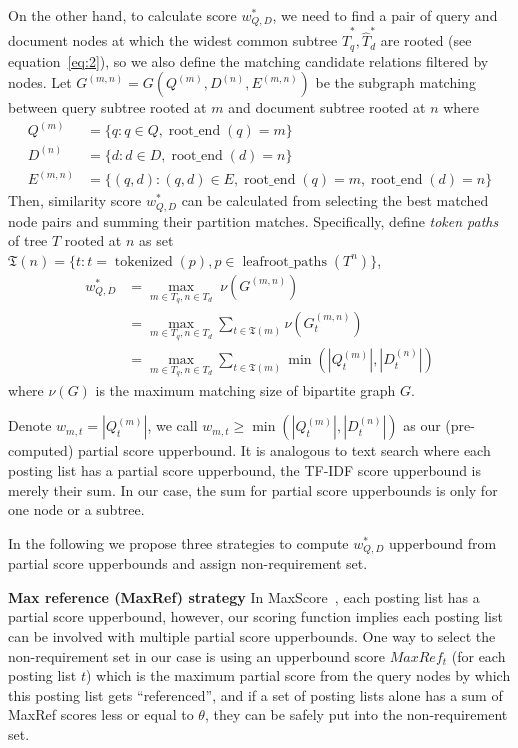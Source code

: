 \documentclass[runningheads]{llncs}
\begin{document}
On the other hand, to calculate score $w^*_{Q, D}$, we need to find a pair of query and document nodes at which the widest common subtree $\hat{T}^*_q, \hat{T}^*_d$ are rooted (see equation~\ref{eq:2}), so we also define the matching candidate relations filtered by nodes.
Let $G^{(m, n)} = G(Q^{(m)}, D^{(n)}, E^{(m, n)})$ be the subgraph matching between query subtree rooted at $m$ and document subtree rooted at $n$  where
$$
\begin{aligned}
Q^{(m)} &= \{ q: q \in Q, \operatorname{root\_end}(q) = m\} \\
D^{(n)} &= \{d: d \in D, \operatorname{root\_end}(d) = n\} \\
E^{(m, n)} &= \{(q, d): (q, d) \in E, \operatorname{root\_end}(q) = m, \operatorname{root\_end}(d) = n\} 
\end{aligned}
$$
Then, similarity score $w^*_{Q, D}$ can be calculated from selecting the best matched node pairs and summing their partition matches.
Specifically, define \textit{token paths} of tree $T$ rooted at $n$ as set $\mathfrak{T}(n) = \{t: t = \operatorname{tokenized}(p), p \in \operatorname{leafroot\_paths}(T^n) \}$,
\begin{align}
w^*_{Q, D} &= \max_{m \in T_q, n \in T_d} \; \nu(G^{(m, n)}) \\
           &= \max_{m \in T_q, n \in T_d} \sum_{t \in \mathfrak{T}(m)} \nu(G^{(m, n)}_t) \\
		   \label{eq:5}
           &= \max_{m \in T_q, n \in T_d} \sum_{t \in \mathfrak{T}(m)} \min(|Q^{(m)}_t|, |D^{(n)}_t|)
\end{align}
where $\nu(G)$ is the maximum matching size of bipartite graph $G$.

Denote $w_{m, t} = |Q^{(m)}_t|$, we call $w_{m, t} \ge \min(|Q^{(m)}_t|, |D^{(n)}_t|)$ as our (pre-computed) partial score upperbound.
It is analogous to text search where each posting list has a partial score upperbound, the TF-IDF score upperbound is merely their sum. In our case, the sum for partial score upperbounds is only for one node or a subtree.

In the following we propose three strategies to compute $w^*_{Q, D}$ upperbound from partial score upperbounds and assign non-requirement set.

\vspace{0.1in}
\noindent \textbf{Max reference (MaxRef) strategy}\;
In MaxScore~\cite{turtle_flood_1995, strohman_turtle_2005}, each posting list has a partial score upperbound, however, our scoring function implies each posting list can be involved with multiple partial score upperbounds.
One way to select the non-requirement set in our case is using an upperbound score $MaxRef_t$ (for each posting list $t$) which is the maximum partial score from the query nodes by which this posting list gets ``referenced'', and if a set of posting lists alone has a sum of MaxRef scores less or equal to $\theta$, they can be safely put into the non-requirement set.
\end{document}
